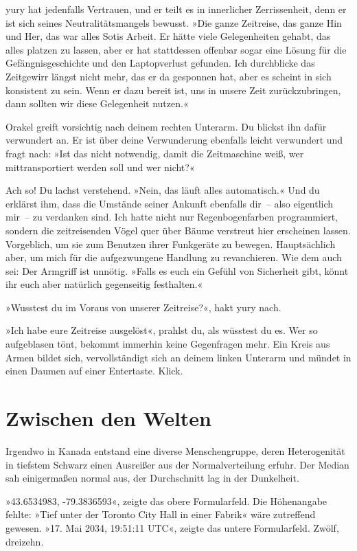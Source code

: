 yury hat jedenfalls Vertrauen, und er teilt es in innerlicher Zerrissenheit, denn er ist sich seines Neutralitätsmangels bewusst. »Die ganze Zeitreise, das ganze Hin und Her, das war alles Sotis Arbeit. Er hätte viele Gelegenheiten gehabt, das alles platzen zu lassen, aber er hat stattdessen offenbar sogar eine Lösung für die Gefängnisgeschichte und den Laptopverlust gefunden. Ich durchblicke das Zeitgewirr längst nicht mehr, das er da gesponnen hat, aber es scheint in sich konsistent zu sein. Wenn er dazu bereit ist, uns in unsere Zeit zurückzubringen, dann sollten wir diese Gelegenheit nutzen.«

Orakel greift vorsichtig nach deinem rechten Unterarm. Du blickst ihn dafür verwundert an. Er ist über deine Verwunderung ebenfalls leicht verwundert und fragt nach: »Ist das nicht notwendig, damit die Zeitmaschine weiß, wer mittransportiert werden soll und wer nicht?«

Ach so! Du lachst verstehend. »Nein, das läuft alles automatisch.« Und du erklärst ihm, dass die Umstände seiner Ankunft ebenfalls dir~– also eigentlich mir~– zu verdanken sind. Ich hatte nicht nur Regenbogenfarben programmiert, sondern die zeitreisenden Vögel quer über Bäume verstreut hier erscheinen lassen. Vorgeblich, um sie zum Benutzen ihrer Funkgeräte zu bewegen. Hauptsächlich aber, um mich für die aufgezwungene Handlung zu revanchieren. Wie dem auch sei: Der Armgriff ist unnötig. »Falls es euch ein Gefühl von Sicherheit gibt, könnt ihr euch aber natürlich gegenseitig festhalten.«

»Wusstest du im Voraus von unserer Zeitreise?«, hakt yury nach.

»Ich habe eure Zeitreise ausgelöst«, prahlst du, als wüsstest du es. Wer so aufgeblasen tönt, bekommt immerhin keine Gegenfragen mehr. Ein Kreis aus Armen bildet sich, vervollständigt sich an deinem linken Unterarm und mündet in einen Daumen auf einer Entertaste. Klick.


\chapter{Zwischen den Welten}

Irgendwo in Kanada entstand eine diverse Menschengruppe, deren Heterogenität in tiefstem Schwarz einen Ausreißer aus der Normalverteilung erfuhr. Der Median sah einigermaßen normal aus, der Durchschnitt lag in der Dunkelheit.

»43.6534983, -79.3836593«, zeigte das obere Formularfeld. Die Höhenangabe fehlte: »Tief unter der Toronto City Hall in einer Fabrik« wäre zutreffend gewesen. »17. Mai 2034, 19:51:11 UTC«, zeigte das untere Formularfeld. Zwölf, dreizehn.

